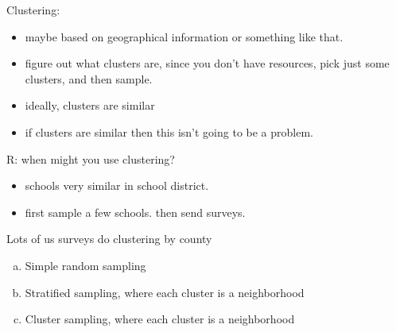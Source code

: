 \documentclass[11pt,containsverbatim,handout,xcolor=xelatex,dvipsnames,table]{beamer}
\newcommand{\solnMult}[1]{#1}
\begin{document}
\begin{frame}
{Clustering:
\begin{itemize}

\item maybe based on geographical information or something like that.

\item figure out what clusters are, since you don't have resources, pick just some clusters, and then sample.

\item ideally, clusters are similar

\item if clusters are similar then this isn't going to be a problem.

\end{itemize}

R: when might you use clustering?
\begin{itemize}
\item schools very similar in school district.
\item first sample a few schools.  then send surveys.
\end{itemize}

Lots of us surveys do clustering by county

}

\end{frame}


\begin{frame}


\begin{enumerate}[(a)]
\item Simple random sampling
\item Stratified sampling, where each cluster is a neighborhood
\item \solnMult{Cluster sampling, where each cluster is a neighborhood}
\end{enumerate}


\end{frame}
\end{document}
